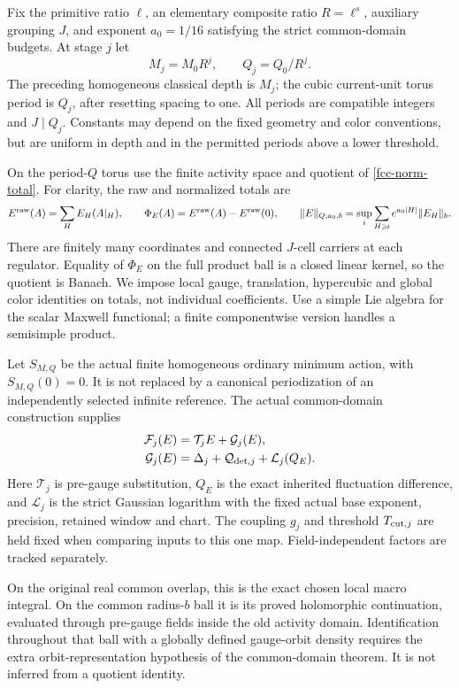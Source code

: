 \documentclass[11pt]{article}
\theoremstyle{remark}
\begin{document}
Fix the primitive ratio $\ell$, an elementary composite ratio
$R=\ell^s$, auxiliary grouping $J$, and exponent $a_0=1/16$
satisfying the strict common-domain budgets. At stage $j$ let
\begin{equation}
 M_j=M_0R^j,\qquad Q_j=Q_0/R^j.
 \label{fqi-scales}
\end{equation}
The preceding homogeneous classical depth is $M_j$; the cubic
current-unit torus period is $Q_j$, after resetting spacing to one.
All periods are compatible integers and $J\mid Q_j$. Constants
may depend on the fixed geometry and color conventions, but are
uniform in depth and in the permitted periods above a lower
threshold.

On the period-$Q$ torus use the finite activity space and quotient
of \eqref{fcc-norm-total}. For clarity, the raw and normalized totals
are
\begin{equation}
 E^{\rm raw}(A)=\sum_HE_H(A|_H),\qquad
 \Phi_E(A)=E^{\rm raw}(A)-E^{\rm raw}(0),\qquad
 \|E\|_{Q;a_0,b}=\sup_i\sum_{H\ni i}e^{a_0|H|}\|E_H\|_b.
 \label{fqi-totals}
\end{equation}
There are finitely many coordinates and connected $J$-cell carriers
at each regulator. Equality of $\Phi_E$ on the full product ball
is a closed linear kernel, so the quotient is Banach. We impose
local gauge, translation, hypercubic and global color identities
on totals, not individual coefficients. Use a simple Lie algebra
for the scalar Maxwell functional; a finite componentwise version
handles a semisimple product.

Let $S_{M,Q}$ be the actual finite homogeneous ordinary minimum
action, with $S_{M,Q}(0)=0$. It is not replaced by a canonical
periodization of an independently selected infinite reference.
The actual common-domain construction supplies
\begin{align}
 \mathcal F_j(E)&=\mathcal T_jE+\mathcal G_j(E),\notag\\
 \mathcal G_j(E)&=\Delta_j+\mathcal Q_{{\rm det},j}
                                      +\mathcal L_j(Q_E).
 \label{fqi-map}
\end{align}
Here $\mathcal T_j$ is pre-gauge substitution, $Q_E$ is the exact
inherited fluctuation difference, and $\mathcal L_j$ is the
strict Gaussian logarithm with the fixed actual base exponent,
precision, retained window and chart. The coupling $g_j$ and
threshold $T_{{\rm cut},j}$ are held fixed when comparing inputs
to this one map. Field-independent factors are tracked separately.

On the original real common overlap, this is the exact chosen
local macro integral. On the common radius-$b$ ball it is its
proved holomorphic continuation, evaluated through pre-gauge
fields inside the old activity domain. Identification throughout
that ball with a globally defined gauge-orbit density requires
the extra orbit-representation hypothesis of the common-domain
theorem. It is not inferred from a quotient identity.
\end{document}
